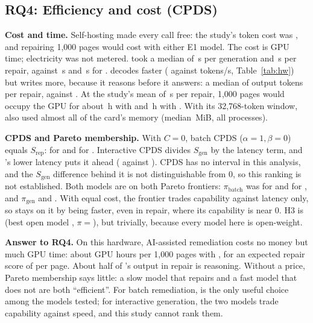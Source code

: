 \subsection{RQ4: Efficiency and cost (CPDS)}\label{sec:rq4}
\textbf{Cost and time.} Self-hosting made every call free: the study's token cost was
, and repairing 1{,}000 pages would cost  with either
E1 model. The cost is GPU time; electricity was not metered. \Q{} took a median of
\,s per generation and \,s per repair, against
\,s and \,s for \QV{}. \Q{} decodes
faster ( against  tokens/s,
Table~\ref{tab:hw}) but writes more, because it reasons before it answers: a median of
 output tokens per repair, against
. At the study's mean of \,s
per repair, 1{,}000 pages would occupy the GPU for about \,h with
\Q{} and \,h with \QV{}. With its 32{,}768-token window, \Q{}
also used almost all of the card's memory (median \,MiB, all processes).

\textbf{CPDS and Pareto membership.} With $C=0$, batch CPDS ($\alpha=1,\beta=0$) equals
$S_\text{rep}$:  for \Q{} and  for
\QV{}. Interactive CPDS divides $S_\text{gen}$ by the latency term, and \QV's lower latency puts it
ahead ( against ).
CPDS has no interval in this analysis, and the $S_\text{gen}$ difference behind it is not
distinguishable from 0, so this ranking is not established. Both models are on both Pareto
frontiers: $\pi_\text{batch}$ was  for \Q{} and
 for \QV{}, and $\pi_\text{gen}$  and
. With equal cost, the frontier trades capability against latency
only, so \QV{} stays on it by being faster, even in repair, where its capability is near 0. H3 is
 (best open model \Q, $\pi={}$), but trivially, because every model
here is open-weight.

\textbf{Answer to RQ4.} On this hardware, AI-assisted remediation costs no money but much GPU
time: about  GPU hours per 1{,}000 pages with \Q, for an expected
repair score of  per page. About half of \Q's output in repair is reasoning. Without a price, Pareto membership says little: a slow model that repairs and a fast model
that does not are both ``efficient''. For batch remediation, \Q{} is the only useful choice among
the models tested; for interactive generation, the two models trade capability against speed, and
this study cannot rank them.
